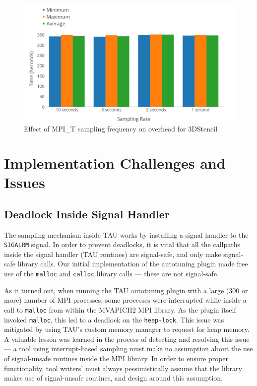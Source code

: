 \begin{center}
        \begin{figure}[tbp!]
                 \includegraphics[width=\columnwidth,keepaspectratio,scale=1.0]{figures/MPI_T_Sampling_Frequently}
                \captionsetup{justification=centering}
                  \caption{Effect of MPI\_T sampling frequency on overhead for 3DStencil}
                   \label{fig:sampling_frequency}
        \end{figure}
\end{center}

\section{Implementation Challenges and Issues}
\subsection{Deadlock Inside Signal Handler} 
The sampling mechanism inside TAU works by installing a signal handler to the \verb+SIGALRM+ signal. In order to prevent deadlocks, it is vital that all the callpaths inside the signal handler (TAU routines) are signal-safe, and only make signal-safe library calls. Our initial implementation of the autotuning plugin made free use of the \verb+malloc+ and \verb+calloc+ library calls --- these are not signal-safe. 
\par As it turned out, when running the TAU autotuning plugin with a large (300 or more) number of MPI processes, some processes were interrupted while inside a call to \verb+malloc+ from within the MVAPICH2 MPI library. As the plugin itself invoked \verb+malloc+, this led to a deadlock on the \verb+heap-lock+. This issue was mitigated by using TAU's custom memory manager to request for heap memory. A valuable lesson was learned in the process of detecting and resolving this issue --- a tool using interrupt-based sampling must make no assumption about the use of signal-unsafe routines inside the MPI library. In order to ensure proper functionality, tool writers' must always pessimistically assume that the library makes use of signal-unsafe routines, and design around this assumption.

